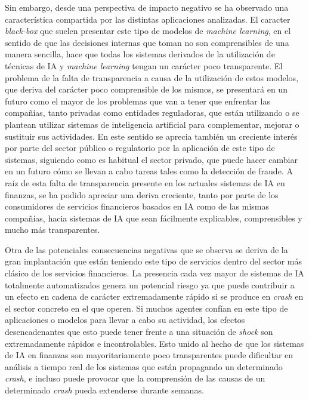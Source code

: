 \documentclass[]{DissertateUSU}
\begin{document}
\noindent Sin embargo, desde una perspectiva de impacto negativo se ha
observado una característica compartida por las distintas aplicaciones
analizadas. El caracter \emph{black-box} que suelen presentar este tipo
de modelos de \emph{machine learning}, en el sentido de que las
decisiones internas que toman no son comprensibles de una manera
sencilla, hace que todas los sistemas derivados de la utilización de
técnicas de IA y \emph{machine learning} tengan un carácter poco
transparente. El problema de la falta de transparencia a causa de la
utilización de estos modelos, que deriva del carácter poco comprensible
de los mismos, se presentará en un futuro como el mayor de los problemas
que van a tener que enfrentar las compañías, tanto privadas como
entidades reguladoras, que están utilizando o se plantean utilizar
sistemas de inteligencia artificial para complementar, mejorar o
sustituir sus actividades. En este sentido se aprecia también un
creciente interés por parte del sector público o regulatorio por la
aplicación de este tipo de sistemas, siguiendo como es habitual el
sector privado, que puede hacer cambiar en un futuro cómo se llevan a
cabo tareas tales como la detección de fraude. A raíz de esta falta de
transparencia presente en los actuales sistemas de IA en finanzas, se ha
podido apreciar una deriva creciente, tanto por parte de los
consumidores de servicios financieros basados en IA como de las mismas
compañías, hacia sistemas de IA que sean fácilmente explicables,
comprensibles y mucho más transparentes.

\noindent Otra de las potenciales consecuencias negativas que se observa
se deriva de la gran implantación que están teniendo este tipo de
servicios dentro del sector más clásico de los servicios financieros. La
presencia cada vez mayor de sistemas de IA totalmente automatizados
genera un potencial riesgo ya que puede contribuir a un efecto en cadena
de carácter extremadamente rápido si se produce en \emph{crash} en el
sector concreto en el que operen. Si muchos agentes confían en este tipo
de aplicaciones o modelos para llevar a cabo su actividad, los efectos
desencadenantes que esto puede tener frente a una situación de
\emph{shock} son extremadamente rápidos e incontrolables. Esto unido al
hecho de que los sistemas de IA en finanzas son mayoritariamente poco
transparentes puede dificultar en análisis a tiempo real de los sistemas
que están propagando un determinado \emph{crash}, e incluso puede
provocar que la comprensión de las causas de un determinado \emph{crash}
pueda extenderse durante semanas.
\end{document}
